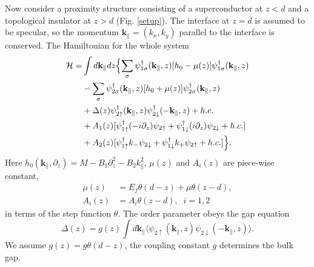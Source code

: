 Now consider a proximity structure consisting 
of a superconductor at $z<d$ and a topological insulator at $z>d$ (Fig. \ref{setup}).
The interface at $z=d$ is assumed to be specular, so the momentum $\mathbf{k_\parallel}=(k_x,k_y)$ 
parallel to the interface is conserved. The Hamiltonian for the whole system 
\begin{align}
\mathcal{H} = &\int d \mathbf{k}_\parallel dz
\Bigl\{ \sum_{\sigma} \psi^{\dagger}_{1 \sigma}(\mathbf{k}_\parallel,z)[h_0 - \mu(z)] \psi^{\dagger}_{1 \sigma}(\mathbf{k}_\parallel,z) 
 \nonumber \\
&- \sum_{\sigma} \psi^{\dagger}_{2 \sigma}(\mathbf{k}_\parallel,z)[h_0 + \mu(z)] \psi^{\dagger}_{2 \sigma}(\mathbf{k}_\parallel,z)\nonumber \\
&+\Delta(z)  \psi^{\dagger}_{2 \uparrow}(\mathbf{k}_\parallel,z) \psi^{\dagger}_{2 \downarrow} (-\mathbf{k}_\parallel,z)+h.c.\nonumber \\
&+A_1(z) [\psi^{\dagger}_{1 \uparrow} (-i\partial_z) \psi_{2 \uparrow} 
+\psi^{\dagger}_{1 \downarrow} (i\partial_z) \psi_{2 \downarrow}+h.c.]  \nonumber\\
&+A_2(z)
[\psi^{\dagger}_{1 \uparrow} k_{-} \psi_{2 \downarrow} +\psi^{\dagger}_{1 \downarrow} k_{+} \psi_{2 \uparrow} +h.c.]
\Bigr \}. \label{hbH}
\end{align}
Here $h_0(\mathbf{k}_\parallel, \partial_z)=M -B_1 \partial_z^2 -B_2 k_\parallel^2$, $\mu(z)$ and $A_i(z)$
are piece-wise constant, 
\begin{align}
\mu(z)&=E_f\theta(d-z)+\mu\theta(z-d),\\
A_i(z)&=A_i\theta(z-d),\;\;i=1,2
\end{align}
in terms of the step function $\theta$. The order parameter obeys the gap equation
\begin{equation}
\Delta(z) = g(z) \int d \mathbf{k}_\parallel \langle {\psi_{2 \uparrow}(\mathbf{k}_\parallel,z) \psi_{2 \downarrow}(-\mathbf{k}_\parallel,z) }\rangle. \label{gapE}
\end{equation}
We assume $g(z)=g\theta(d-z)$, the coupling constant $g$ determines the bulk gap.

